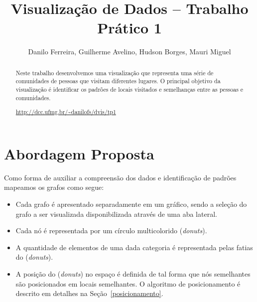 \documentclass[12pt]{article}
\title{Visualização de Dados -- Trabalho Prático 1}
\author{Danilo Ferreira, Guilherme Avelino, Hudson Borges, Mauri Miguel}
\begin{document}
\maketitle

\begin{abstract}
Neste trabalho desenvolvemos uma visualização que representa uma série de comunidades de pessoas que visitam diferentes lugares. O principal objetivo da visualização é identificar os padrões de locais visitados e semelhanças entre as pessoas e comunidades.\\
\centerline{\url{http://dcc.ufmg.br/~danilofs/dvis/tp1}}
\end{abstract}


\section{Abordagem Proposta}

Como forma de auxiliar a compreensão dos dados e identificação de padrões mapeamos os grafos como segue:
\begin{itemize} 
	\item Cada grafo é apresentado separadamente em um gráfico, sendo a seleção do grafo a ser visualizada disponibilizada através de uma aba lateral.
	\item Cada nó é representada por um círculo multicolorido (\textit{donuts}). 
	\item A quantidade de elementos de uma dada categoria é representada pelas fatias do  (\textit{donuts}).
	\item A posição do (\textit{donuts}) no espaço é definida de tal forma que nós semelhantes são posicionados em locais semelhantes. O algoritmo de posicionamento é descrito em detalhes na Seção~\ref{posicionamento}.
	
\end{itemize}
\end{document}
